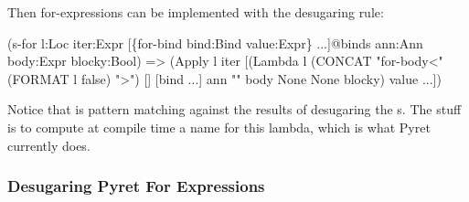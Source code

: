 Then for-expressions can be implemented with the desugaring rule:
\begin{Codes}
   (s-for l:Loc
          iter:Expr
          [\{for-bind bind:Bind value:Expr\} ...]@binds
          ann:Ann
          body:Expr
          blocky:Bool)
=> (Apply l iter
     [(Lambda l (CONCAT "for-body<" (FORMAT l false) ">")
        [] [bind ...] ann "" body None None blocky)
      value ...])
\end{Codes}

Notice that  is pattern matching against the results of
desugaring the s. The  stuff is to
compute at compile time a name for this lambda, which is what Pyret
currently does.

\newcommand{\C}{\(\sb{c}\)}
\subsubsection{Desugaring Pyret For Expressions}
